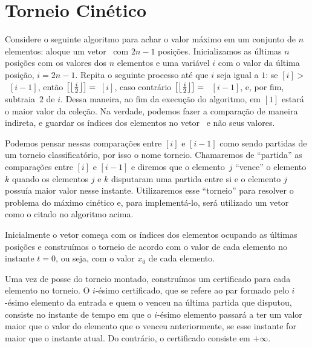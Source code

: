 
\newcommand{\thickness}{0.75mm}

\section{Torneio Cinético} \label{torneio:secao} Considere o
seguinte algoritmo para achar o valor máximo em um conjunto de $n$
elementos: aloque um vetor \torneio~com $2n - 1$ posições.
Inicializamos as últimas $n$ posições com os valores dos $n$
elementos e uma variável $i$ com o valor da última posição, $i = 2n
- 1$. Repita o seguinte processo até que $i$ seja igual a $1$: se
\torneio$[i] > $~\torneio$[i - 1]$, então
\torneio$\left[\left\lfloor \frac{i}{2} \right\rfloor\right] =$~\torneio$[i]$, caso
contrário \torneio$\left[\left\lfloor \frac{i}{2} \right\rfloor\right] =$~ \torneio$[i
- 1]$, e, por fim, subtraia~$2$ de $i$. Dessa maneira, ao fim da
execução do algoritmo, em \torneio$[1]$ estará o maior valor da
coleção. Na verdade, podemos fazer a comparação de maneira indireta,
e guardar os índices dos elementos no vetor \torneio~e não seus
valores.

Podemos pensar nessas comparações entre \torneio$[i]$ e
\torneio$[i-1]$ como sendo partidas de um torneio classificatório,
por isso o nome torneio. Chamaremos de ``partida'' as comparações
entre \torneio$[i]$ e \torneio$[i-1]$ e diremos que o elemento~$j$
``vence'' o elemento $k$ quando os elementos $j$ e $k$ disputaram
uma partida entre si e o elemento $j$ possuía maior valor nesse
instante. Utilizaremos esse ``torneio'' para resolver o problema do
máximo cinético e, para implementá-lo, será utilizado um vetor como
o citado no algoritmo acima.



Inicialmente o vetor começa com os índices dos elementos ocupando as
últimas posições e construímos o torneio de acordo com o valor de
cada elemento no instante $t = 0$, ou seja, com o valor $x_0$ de
cada elemento.

Uma vez de posse do torneio montado, construímos um certificado para
cada elemento no torneio. O $i$-ésimo certificado, que se refere ao
par formado pelo $i$-ésimo elemento da entrada e quem o venceu na
última partida que disputou, consiste no instante de tempo em que o
$i$-ésimo elemento passará a ter um valor maior que o valor do
elemento que o venceu anteriormente, se esse instante for maior que
o instante atual. Do contrário, o certificado consiste em $+\infty$.

